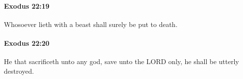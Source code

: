 		\paragraph{Exodus 22:19} %
			\label{EXODUS-22-19}

			Whosoever lieth with a beast shall surely be put to death.


		\paragraph{Exodus 22:20} %
			\label{EXODUS-22-20}

			He that sacrificeth unto any god, save unto the LORD only, he shall be utterly destroyed.


